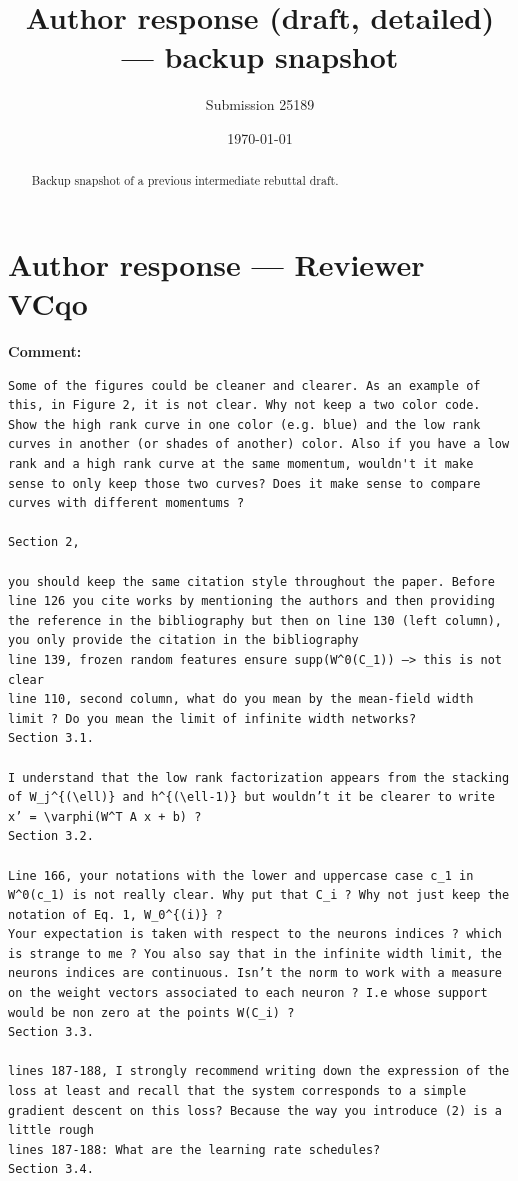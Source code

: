 \documentclass[11pt,a4paper]{article}
\title{Author response (draft, detailed) --- backup snapshot}
\author{Submission 25189}
\date{\today}
\begin{document}
\maketitle

\begin{abstract}
\noindent
Backup snapshot of a previous intermediate rebuttal draft.
\end{abstract}

\section*{Author response --- Reviewer VCqo}

\textbf{Comment:}
\begin{verbatim}
Some of the figures could be cleaner and clearer. As an example of this, in Figure 2, it is not clear. Why not keep a two color code. Show the high rank curve in one color (e.g. blue) and the low rank curves in another (or shades of another) color. Also if you have a low rank and a high rank curve at the same momentum, wouldn't it make sense to only keep those two curves? Does it make sense to compare curves with different momentums ?

Section 2,

you should keep the same citation style throughout the paper. Before line 126 you cite works by mentioning the authors and then providing the reference in the bibliography but then on line 130 (left column), you only provide the citation in the bibliography
line 139, frozen random features ensure supp(W^0(C_1)) —> this is not clear
line 110, second column, what do you mean by the mean-field width limit ? Do you mean the limit of infinite width networks?
Section 3.1.

I understand that the low rank factorization appears from the stacking of W_j^{(\ell)} and h^{(\ell-1)} but wouldn’t it be clearer to write x’ = \varphi(W^T A x + b) ?
Section 3.2.

Line 166, your notations with the lower and uppercase case c_1 in W^0(c_1) is not really clear. Why put that C_i ? Why not just keep the notation of Eq. 1, W_0^{(i)} ?
Your expectation is taken with respect to the neurons indices ? which is strange to me ? You also say that in the infinite width limit, the neurons indices are continuous. Isn’t the norm to work with a measure on the weight vectors associated to each neuron ? I.e whose support would be non zero at the points W(C_i) ?
Section 3.3.

lines 187-188, I strongly recommend writing down the expression of the loss at least and recall that the system corresponds to a simple gradient descent on this loss? Because the way you introduce (2) is a little rough
lines 187-188: What are the learning rate schedules?
Section 3.4.


\end{verbatim}
\end{document}
